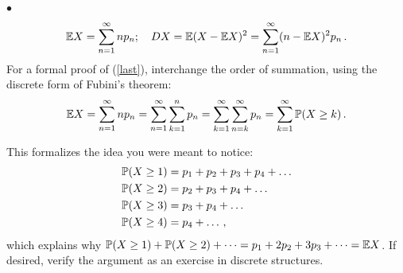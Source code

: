 \documentclass[a4paper]{report}
\begin{document}
\begin{problem}
$\bullet$
\[
\E X = \sum_{n=1}^\infty np_n; \quad D X = \E (X - \E X)^2 = \sum_{n=1}^\infty (n - \E X)^2p_n \, .
\]For a formal proof of (\ref{last}), interchange the order of summation, using
the discrete form of Fubini's theorem:
    \begin{align*}
    \E X = \sum_{n=1}^\infty np_n = \sum_{n=1}^\infty \sum_{k=1}^n p_n
    = \sum_{k=1}^\infty
      \sum_{n = k}^\infty p_n=  \sum_{k=1}^\infty
      \P(X \geq k) \, .
     \end{align*}

This formalizes the idea
you were meant to notice:
\begin{align*}
    &\P(X \geq 1) = p_1 + p_2 + p_3 + p_4 + \dots \\
    &\P(X \geq 2) = p_2 + p_3 + p_4 + \dots\\
    &\P(X \geq 3) = p_3 + p_4 + \dots\\
    &\P(X \geq 4) = p_4 + \dots\, ,
\end{align*}
which explains why $\P(X\geq1)+\P(X\geq2)+\dots=p_1+2p_2
+3p_3+\dots=\E X$. If desired, verify the argument as an exercise in discrete structures.

\end{problem}
\end{document}
